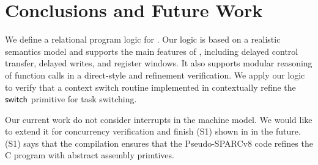 \section{Conclusions and Future Work}
\label{sec:conclusion}
We define a relational program logic for \sparc.
Our logic is based on a realistic semantics
model and supports the main features of \sparc,
including delayed control transfer, delayed writes,
and register windows.
It also supports modular reasoning of
function calls in a direct-style and
refinement verification.
We apply our logic to verify that a context switch routine 
implemented in \sparc{} contextually refine the $\mathsf{switch}$
primitive for task switching.

Our current work 
do not consider interrupts in the machine model.
We would like to extend it for concurrency verification
and finish {\color{blue} (S1)} shown in
\Fig{\ref{fig:idea to establish contextual refinement}} 
in the future. 
{\color{blue} (S1)} says that 
the compilation ensures that the Pseudo-SPARCv8 code 
refines the C program with abstract assembly primtives.

